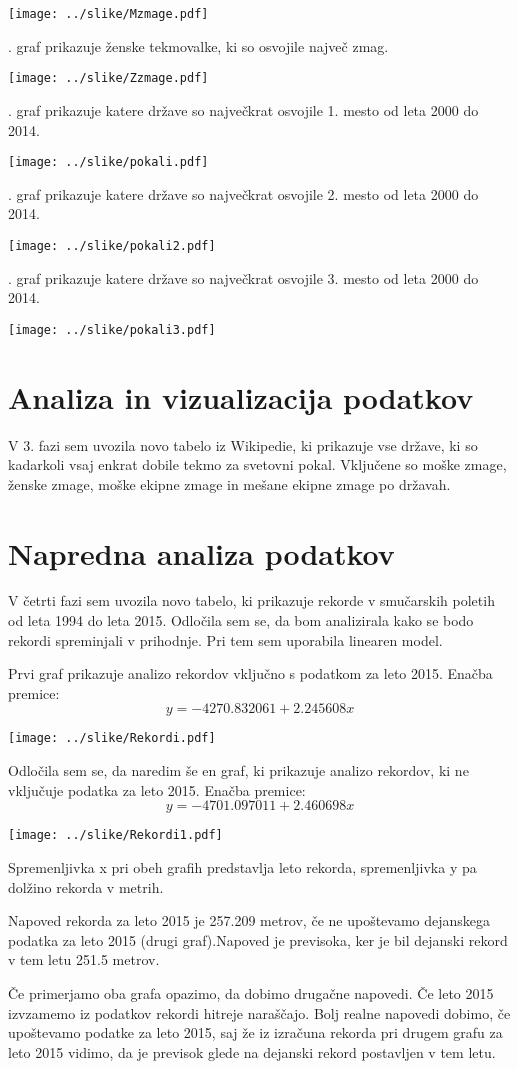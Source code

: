 \documentclass[11pt,a4paper]{article}
\begin{document}
\texttt{[image: ../slike/Mzmage.pdf]}

. graf prikazuje ženske tekmovalke, ki so osvojile največ zmag.

\texttt{[image: ../slike/Zzmage.pdf]}

. graf prikazuje katere države so največkrat osvojile 1. mesto od leta 2000 do 2014.

\texttt{[image: ../slike/pokali.pdf]}

. graf prikazuje katere države so največkrat osvojile 2. mesto od leta 2000 do 2014.

\texttt{[image: ../slike/pokali2.pdf]}

. graf prikazuje katere države so največkrat osvojile 3. mesto od leta 2000 do 2014.

\texttt{[image: ../slike/pokali3.pdf]}

\newpage
\section{Analiza in vizualizacija podatkov}
V 3. fazi sem uvozila novo tabelo iz Wikipedie, ki prikazuje vse države, ki so kadarkoli vsaj enkrat dobile tekmo za svetovni pokal. Vključene so moške zmage, ženske zmage, moške ekipne zmage in mešane ekipne zmage po državah.


\newpage
\section{Napredna analiza podatkov}
V četrti fazi sem uvozila novo tabelo, ki prikazuje rekorde v smučarskih poletih od leta 1994 do leta 2015. Odločila sem se, da bom analizirala kako se bodo rekordi spreminjali v prihodnje. Pri tem sem uporabila linearen model.

Prvi graf prikazuje analizo rekordov vključno s podatkom za leto 2015. Enačba premice: $$ y=-4270.832061 + 2.245608x$$

\texttt{[image: ../slike/Rekordi.pdf]}

Odločila sem se, da naredim še en graf, ki prikazuje analizo rekordov, ki ne vključuje podatka za leto 2015. Enačba premice: $$y=-4701.097011 + 2.460698x$$

\texttt{[image: ../slike/Rekordi1.pdf]}

Spremenljivka x pri obeh grafih predstavlja leto rekorda, spremenljivka y pa dolžino rekorda v metrih.

Napoved rekorda za leto 2015 je 257.209 metrov, če ne upoštevamo dejanskega podatka za leto 2015 (drugi graf).Napoved je previsoka, ker je bil dejanski rekord v tem letu 251.5 metrov.

Če primerjamo oba grafa opazimo, da dobimo drugačne napovedi. Če leto 2015 izvzamemo iz podatkov rekordi hitreje naraščajo. Bolj realne napovedi dobimo, če upoštevamo podatke za leto 2015, saj že iz izračuna rekorda pri drugem grafu za leto 2015 vidimo, da je previsok glede na dejanski rekord postavljen v tem letu.
\end{document}
